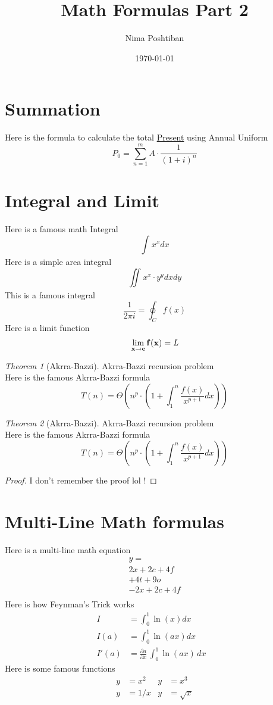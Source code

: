 \documentclass{article}
\author{Nima Poshtiban}
\date{\today}
\title{Math Formulas Part 2}
\theoremstyle{remark} %
\newtheorem{theorem}{Theorem}[section] %
\begin{document}
\maketitle
\section{\color{blue}Summation}
Here is the formula to calculate the total \ul{Present} using Annual Uniform %
\[
P_{0}=\sum_{n=1}^{m}{A\cdot\frac{1}{\left(1+i\right)^{n}}}
\]
\section{Integral and Limit}
Here is a famous math Integral
\[
\int_{}{}{x^{x} dx}
\]
Here is a simple area integral
\[
\iint_{}{x^{x}\cdot}{y^{y}}{dx dy}
\]
This is a famous integral
\[
\frac{1}{2\pi i} = \oint_{C}^{}{f(x)}
\]
Here is a limit function
\[
\mathbf{\lim_{x\to c}{f(x)} = \it{L}}
\]
\begin{theorem}[Akrra-Bazzi]
Akrra-Bazzi recursion problem\\
Here is the famous Akrra-Bazzi formula
\[
{T(n)} = \Theta \left(n^{p}\cdot\left(1+\int_{1}^{n}{\frac{f(x)}{x^{p+1}}dx}\right)\right)
\]
\end{theorem}
\begin{theorem}[Akrra-Bazzi]
	Akrra-Bazzi recursion problem\\
	Here is the famous Akrra-Bazzi formula
	\[
	{T(n)} = \Theta \left(n^{p}\cdot\left(1+\int_{1}^{n}{\frac{f(x)}{x^{p+1}}dx}\right)\right)
	\]
\end{theorem}
\begin{proof}
	I don't remember the proof lol !
\end{proof}

\section{Multi-Line Math formulas}
Here is a multi-line math equation
\begin{multline}
	y = \\2x + 2c +4f\\+ 4t + 9o \\- 2x + 2c +4f\\
\end{multline}
Here is how Feynman's Trick works
\begin{align}
		I &= \int_{0}^{1}{\ln\left(x\right)dx}&\\I(a)&= \int_{0}^{1}{\ln\left(ax\right)dx}\\I'(a) &= \frac{\partial a}{\partial x}\,\int_{0}^{1}{\ln\left(ax\right)\,dx}
\end{align}
Here is some famous functions
\begin{align}
	y &= x^{2} &y&=x^{3} \\ y&={1/x} &y&=\sqrt{x}
\end{align}
\end{document}

